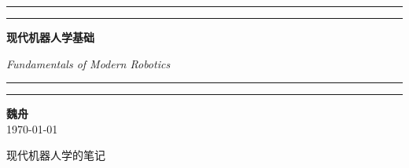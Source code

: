 \documentclass[11pt,a4paper]{book}
\begin{document}
\begin{titlepage}
    \centering
    
    \vspace*{2cm} %
    
    \rule{\textwidth}{1pt}\par
    \vspace{0.2cm}
    \rule{\textwidth}{3pt}\par
    
    \vspace{1.5cm}
    
    {\Huge \bfseries 现代机器人学基础 \par}
    \vspace{0.5cm}
    {\Large \itshape Fundamentals of Modern Robotics \par} %
    
    \vspace{1cm}

    

    \vspace{1cm}
    
    \rule{\textwidth}{3pt}\par
    \vspace{0.2cm}
    \rule{\textwidth}{1pt}\par
    
    \vspace{2cm}
    
    \begin{flushright}
        {\Large \textbf{魏舟} } \\
        \vspace{0.5cm}
        {\large \today}
    \end{flushright}
    
    \vfill
    
    {\color{gray} \footnotesize 现代机器人学的笔记}

\end{titlepage}

\tableofcontents










\end{document}
